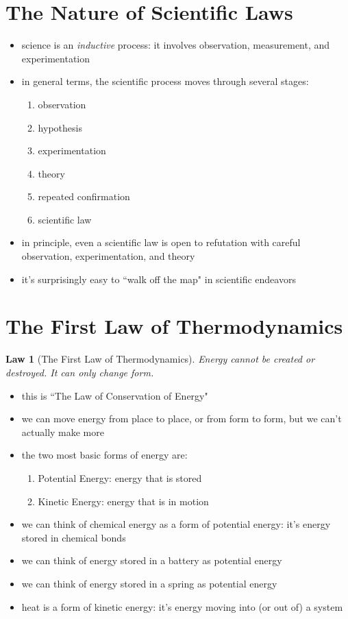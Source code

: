 \documentclass[11pt, oneside]{article}   	%
\newtheorem{law}{Law}
\begin{document}
\section{The Nature of Scientific Laws}
\begin{itemize}
\item science is an \emph{inductive} process: it involves observation, measurement, and experimentation
\item in general terms, the scientific process moves through several stages:
\begin{enumerate}
\item observation
\item hypothesis
\item experimentation
\item theory
\item repeated confirmation
\item scientific law
\end{enumerate}
\item in principle, even a scientific law is open to refutation with careful observation, experimentation, and theory
\item it's surprisingly easy to ``walk off the map" in scientific endeavors
\end{itemize}

\section{The First Law of Thermodynamics}

\begin{law}[The First Law of Thermodynamics] \label{law:law-thermo-d-1}
Energy cannot be created or destroyed. It can only change form.
\end{law}

\begin{itemize}
\item this is ``The Law of Conservation of Energy"
\item we can move energy from place to place, or from form to form, but we can't actually make more
\item the two most basic forms of energy are:
\begin{enumerate}
\item Potential Energy: energy that is stored
\item Kinetic Energy: energy that is in motion
\end{enumerate}
\item we can think of chemical energy as a form of potential energy: it's energy stored in chemical bonds
\item we can think of energy stored in a battery as potential energy
\item we can think of energy stored in a spring as potential energy
\item heat is a form of kinetic energy: it's energy moving into (or out of) a system
\end{itemize}
\end{document}
